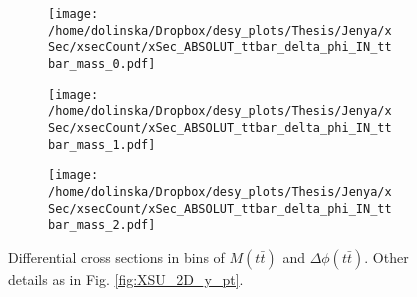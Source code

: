 \begin{figure}[p]
\centering
\begin{subfigure}
  \centering
  \texttt{[image: /home/dolinska/Dropbox/desy\_plots/Thesis/Jenya/xSec/xsecCount/xSec\_ABSOLUT\_ttbar\_delta\_phi\_IN\_ttbar\_mass\_0.pdf]}
\end{subfigure}
\begin{subfigure}
  \centering
  \texttt{[image: /home/dolinska/Dropbox/desy\_plots/Thesis/Jenya/xSec/xsecCount/xSec\_ABSOLUT\_ttbar\_delta\_phi\_IN\_ttbar\_mass\_1.pdf]}
\end{subfigure}
\begin{subfigure}
  \centering
  \texttt{[image: /home/dolinska/Dropbox/desy\_plots/Thesis/Jenya/xSec/xsecCount/xSec\_ABSOLUT\_ttbar\_delta\_phi\_IN\_ttbar\_mass\_2.pdf]}
\end{subfigure}
\caption{Differential cross sections in bins of $M(t\bar{t})$ and $\Delta\phi(t\bar{t})$. Other details as in Fig. \ref{fig:XSU_2D_y_pt}.}
\label{fig:XSU_2D_phi_Mtt}
\end{figure}


